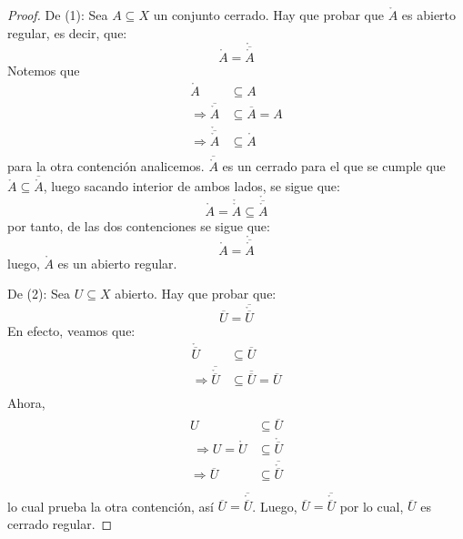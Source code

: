 \documentclass[12pt]{report}
\theoremstyle{largebreak}
\newcommand{\Int}[1]{\ensuremath{\mathring{#1}}}
\newcommand{\Cls}[1]{\ensuremath{\overline{#1}}}
\begin{document}
    \begin{proof}
        De (1): Sea $A\subseteq X$ un conjunto cerrado. Hay que probar que $\Int{A}$ es abierto regular, es decir, que:
        \begin{equation*}
            \Int{A}=\Int{\Cls{\Int{A}}}
        \end{equation*}
        Notemos que
        \begin{equation*}
            \begin{split}
                \Int{A}&\subseteq A\\
                \Rightarrow \Cls{\Int{A}}&\subseteq \Cls{A}=A\\
                \Rightarrow \Int{\Cls{\Int{A}}}&\subseteq \Int{A}\\
            \end{split}
        \end{equation*}
        para la otra contención analicemos. $\Cls{\Int{A}}$ es un cerrado para el que se cumple que $\Int{A}\subseteq\Cls{\Int{A}}$, luego sacando interior de ambos lados, se sigue que:
        \begin{equation*}
            \Int{A}=\Int{\Int{A}}\subseteq\Int{\Cls{\Int{A}}}
        \end{equation*}
        por tanto, de las dos contenciones se sigue que:
        \begin{equation*}
            \Int{A}=\Int{\Cls{\Int{A}}}
        \end{equation*}
        luego, $\Int{A}$ es un abierto regular.

        De (2): Sea $U\subseteq X$ abierto. Hay que probar que:
        \begin{equation*}
            \Cls{U}=\Cls{\Int{\Cls{U}}}
        \end{equation*}
        En efecto, veamos que:
        \begin{equation*}
            \begin{split}
                \Int{\Cls{U}}&\subseteq\Cls{U}\\
                \Rightarrow \Cls{\Int{\Cls{U}}}&\subseteq\Cls{\Cls{U}}=\Cls{U}\\
            \end{split}
        \end{equation*}
        Ahora, 
        \begin{equation*}
            \begin{split}
                \begin{split}
                    U&\subseteq\Cls{U}\\\
                    \Rightarrow U=\Int{U}&\subseteq\Int{\Cls{U}}\\
                    \Rightarrow \Cls{U}&\subseteq \Cls{\Int{\Cls{U}}}\\
                \end{split}
            \end{split}
        \end{equation*}
        lo cual prueba la otra contención, así $\Cls{U}=\Cls{\Int{\Cls{U}}}$. Luego, $\Cls{U}=\Cls{\Int{\Cls{U}}}$ por lo cual, $\Cls{U}$ es cerrado regular.


\end{proof}
\end{document}
